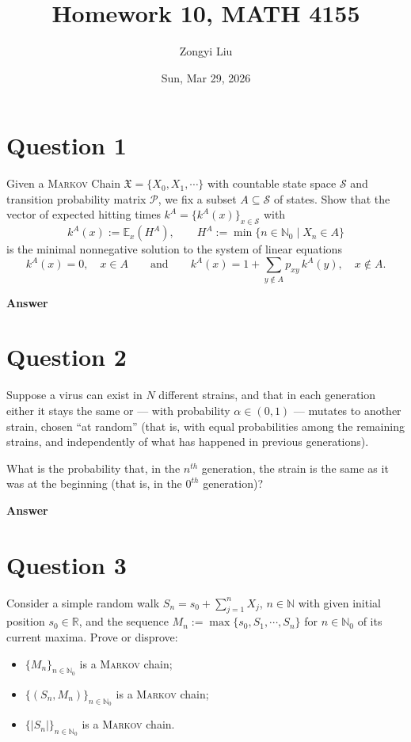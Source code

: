 \documentclass[letterpaper]{article}
\title{Homework 10, MATH 4155}
\author{Zongyi Liu}
\date{Sun, Mar 29, 2026}
\begin{document}
		\maketitle
		\section{Question 1}

		Given a \textsc{Markov} Chain $\mathfrak{X} = \{X_0, X_1, \cdots\}$ with countable state space $\mathcal{S}$ and transition probability matrix $\mathcal{P}$, we fix a subset $A \subseteq \mathcal{S}$ of states. Show that the vector of expected hitting times $k^A = \{k^A(x)\}_{x \in \mathcal{S}}$ with
		\[
		k^A(x) := \mathbb{E}_x(H^A), \qquad H^A := \min\{n \in \mathbb{N}_0 \mid X_n \in A\}
		\]
		is the minimal nonnegative solution to the system of linear equations
		\[
		k^A(x) = 0, \quad x \in A \qquad \text{and} \qquad k^A(x) = 1 + \sum_{y \notin A} p_{xy}\, k^A(y), \quad x \notin A.
		\]
		
		
		
		\textbf{Answer}
		
		\clearpage
		
		\section{Question 2}
		
		Suppose a virus can exist in $N$ different strains, and that in each generation either it stays the same or --- with probability $\alpha \in (0,1)$ --- mutates to another strain, chosen ``at random'' (that is, with equal probabilities among the remaining strains, and independently of what has happened in previous generations).
		
		 What is the probability that, in the $n^{th}$ generation, the strain is the same as it was at the beginning (that is, in the $0^{th}$ generation)?
		
		
		\textbf{Answer}
		
		\clearpage
		
		\section{Question 3}
		
		
		Consider a simple random walk $S_n = s_0 + \sum_{j=1}^{n} X_j$, $n \in \mathbb{N}$ with given initial position $s_0 \in \mathbb{R}$, and the sequence $M_n := \max\{s_0, S_1, \cdots, S_n\}$ for $n \in \mathbb{N}_0$ of its current maxima. Prove or disprove:
		\begin{itemize}
			\item[(i)] $\{M_n\}_{n \in \mathbb{N}_0}$ is a \textsc{Markov} chain;
			\item[(ii)] $\{(S_n, M_n)\}_{n \in \mathbb{N}_0}$ is a \textsc{Markov} chain;
			\item[(iii)] $\{|S_n|\}_{n \in \mathbb{N}_0}$ is a \textsc{Markov} chain.
		\end{itemize}
		
\end{document}
